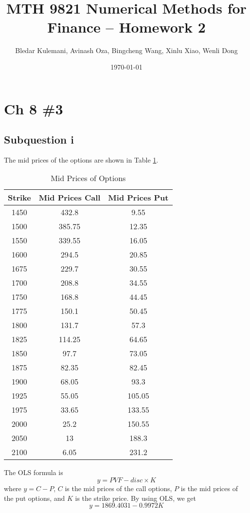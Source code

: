 \documentclass{article}
\title{MTH 9821 Numerical Methods for Finance -- Homework 2}
\author{Bledar Kulemani, Avinash Oza, Bingcheng Wang, Xinlu Xiao, Wenli Dong}
\date{\today}
\DeclareMathOperator{\1}{\mathit{1}}
\numberwithin{figure}{section} %
\numberwithin{table}{section}
\begin{document}
\maketitle

\section{Ch 8 \#3}
\subsection{Subquestion i}

The mid prices of the options are shown in Table \ref{tab:midPrice}.

	\begin{table}[hbtp]
	\centering
    \caption{\label{tab:midPrice}%
    Mid Prices of Options}
    \small
    \begin{tabular}{ccc}
    \hline\hline
    \bf{Strike} & \bf{Mid Prices Call} & \bf{Mid Prices Put}\\ 
    \hline
1450 & 432.8 & 9.55\\
1500 & 385.75 & 12.35\\
1550 & 339.55 & 16.05\\
1600 & 294.5 & 20.85\\
1675 & 229.7 & 30.55\\
1700 & 208.8 & 34.55\\
1750 & 168.8 & 44.45\\
1775 & 150.1 & 50.45\\
1800 & 131.7 & 57.3\\
1825 & 114.25 & 64.65\\
1850 & 97.7 & 73.05\\
1875 & 82.35 & 82.45\\
1900 & 68.05 & 93.3\\
1925 & 55.05 & 105.05\\
1975 & 33.65 & 133.55\\
2000 & 25.2 & 150.55\\
2050 & 13 & 188.3\\
2100 & 6.05 & 231.2\\
    \hline\hline
    \end{tabular}
    \end{table}
    
The OLS formula is
	\begin{equation*}
	y = PVF - disc \times K
	\end{equation*}
where $y = C - P$, $C$ is the mid prices of the call options, $P$ is the mid prices of the put options, and $K$ is the strike price. By using OLS, we get
	\begin{equation*}
	y = 1869.4031 - 0.9972K
	\end{equation*}
	
\end{document}
